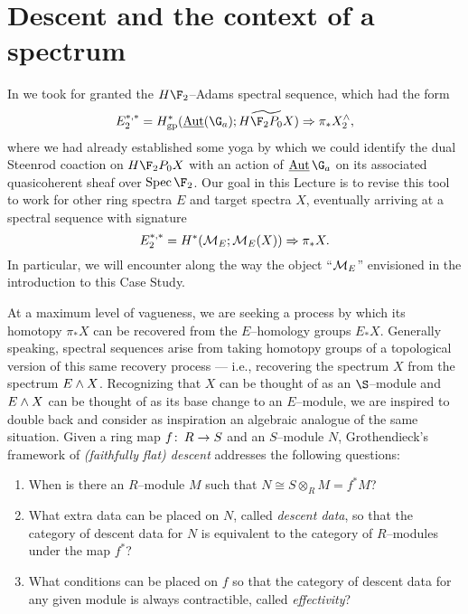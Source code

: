 








\section{Descent and the context of a spectrum}\label{StableContextLecture}


In  we took for granted the $H\F_2$--Adams spectral sequence, which had the form \[E_2^{*, *} = H^*_{\mathrm{gp}}(\InternalAut(\G_a); \widetilde{H\F_2P_0 X}) \Rightarrow \pi_* X^\wedge_2,\] where we had already established some yoga by which we could identify the dual Steenrod coaction on $H\F_2P_0 X$ with an action of $\InternalAut{\G_a}$ on its associated quasicoherent sheaf over $\Spec \F_2$.  Our goal in this Lecture is to revise this tool to work for other ring spectra $E$ and target spectra $X$, eventually arriving at a spectral sequence with signature \[E_2^{*, *} = H^*(\mathcal{M}_{E}; \mathcal{M}_{E}(X)) \Rightarrow \pi_* X.\]  In particular, we will encounter along the way the object ``$\mathcal{M}_{E}$'' envisioned in the introduction to this Case Study.

At a maximum level of vagueness, we are seeking a process by which its homotopy $\pi_* X$ can be recovered from the $E$--homology groups $E_* X$.  Generally speaking, spectral sequences arise from taking homotopy groups of a topological version of this same recovery process --- i.e., recovering the spectrum $X$ from the spectrum $E \wedge X$.  Recognizing that $X$ can be thought of as an $\S$--module and $E \wedge X$ can be thought of as its base change to an $E$--module, we are inspired to double back and consider as inspiration an algebraic analogue of the same situation.  Given a ring map $f\colon\thinspace R \to S$ and an $S$--module $N$, Grothendieck's framework of \textit{(faithfully flat) descent} addresses the following questions:
\begin{enumerate}
\item When is there an $R$--module $M$ such that $N \cong S \otimes_R M = f^* M$?
\item What extra data can be placed on $N$, called \textit{descent data}, so that the category of descent data for $N$ is equivalent to the category of $R$--modules under the map $f^*$?
\item What conditions can be placed on $f$ so that the category of descent data for any given module is always contractible, called \textit{effectivity}?
\end{enumerate}

